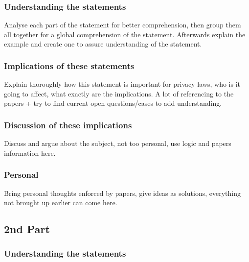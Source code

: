 \documentclass[12pt]{article} %
\begin{document}

\subsubsection{Understanding the statements} %

Analyse each part of the statement for better comprehension, then group them all together for a global comprehension of the statement. Afterwards explain the example and create one to assure understanding of the statement.


\subsubsection{Implications of these statements} %

Explain thoroughly how this statement is important for privacy laws, who is it going to affect, what exactly are the implications. A lot of referencing to the papers + try to find current open questions/cases to add understanding.  


\subsubsection{Discussion of these implications} %

Discuss and argue about the subject, not too personal, use logic and papers information here.

\subsubsection{Personal}

Bring personal thoughts enforced by papers, give ideas as solutions, everything not brought up earlier can come here.



\subsection{2nd Part} %


\subsubsection{Understanding the statements}
\end{document}
